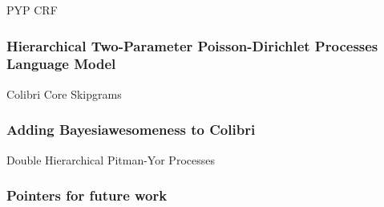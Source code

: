 \documentclass{beamer}
\begin{document}
PYP
CRF
\begin{frame}
    \frametitle{Hierarchical Two-Parameter Poisson-Dirichlet Processes Language Model}
\end{frame}



Colibri Core
Skipgrams
\begin{frame}
    \frametitle{Adding Bayesiawesomeness to Colibri}

\end{frame}




Double Hierarchical Pitman-Yor Processes
\begin{frame}
    \frametitle{Pointers for future work}
\end{frame}
\end{document}
